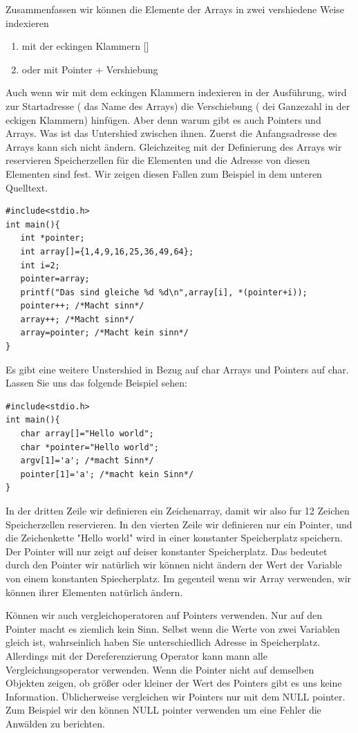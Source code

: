 \documentclass{article}[12pt]
\begin{document}
Zusammenfassen wir können die Elemente der Arrays in zwei vershiedene Weise indexieren
\begin{enumerate}
\item mit der eckingen Klammern []
\item oder mit Pointer  + Vershiebung
\end{enumerate}
Auch wenn wir mit dem eckingen Klammern indexieren in der Ausführung, wird zur Startadresse
( das Name des Arrays) die Verschiebung ( dei Ganzezahl in der eckigen Klammern) hinfügen. Aber
denn warum gibt es auch Pointers und Arrays. Was ist das Untershied zwischen ihnen. Zuerst
die Anfangsadresse des Arrays kann sich nicht ändern. Gleichzeiteg mit der Definierung des
Arrays wir reservieren Speicherzellen für die Elementen und die Adresse von diesen Elementen sind
fest. Wir zeigen diesen Fallen zum Beispiel in dem unteren Quelltext.
\begin{lstlisting}
#include<stdio.h>
int main(){
   int *pointer;
   int array[]={1,4,9,16,25,36,49,64};
   int i=2;
   pointer=array;
   printf("Das sind gleiche %d %d\n",array[i], *(pointer+i));
   pointer++; /*Macht sinn*/
   array++; /*Macht sinn*/
   array=pointer; /*Macht kein sinn*/
}
\end{lstlisting} 
Es gibt eine weitere Unstershied in Bezug auf char Arrays und Pointers auf char. Lassen
Sie uns das folgende Beispiel sehen:
\begin{lstlisting}
#include<stdio.h>
int main(){
   char array[]="Hello world";
   char *pointer="Hello world";
   argv[1]='a'; /*macht Sinn*/
   pointer[1]='a'; /*macht kein Sinn*/
}
\end{lstlisting}
In der dritten Zeile wir definieren ein Zeichenarray, damit wir also fur 12 Zeichen Speicherzellen reservieren. 
In den vierten Zeile wir definieren nur ein Pointer, und die Zeichenkette "Hello world" wird in einer konstanter
Speicherplatz speichern. Der Pointer will nur zeigt auf deiser konstanter Speicherplatz. Das bedeutet durch den
Pointer wir natürlich wir können nicht ändern der Wert der Variable von einem konstanten Spiecherplatz. Im gegenteil
wenn wir Array verwenden, wir können ihrer Elementen natürlich ändern.

Können wir auch vergleichoperatoren auf Pointers verwenden. Nur auf den Pointer macht es ziemlich kein Sinn.
Selbst wenn die Werte von zwei Variablen gleich ist, wahrseinlich haben Sie unterschiedlich Adresse in Speicherplatz.
Allerdings mit der Dereferenzierung Operator kann mann alle Vergleichungsoperator verwenden. Wenn die Pointer nicht
auf demselben Objekten zeigen, ob größer oder kleiner der Wert des Pointers gibt es uns keine Information. 
Üblicherweise vergleichen wir Pointers nur mit dem NULL pointer. Zum Beispiel wir den können NULL pointer 
verwenden um eine Fehler die Anwälden zu berichten.
\end{document}
